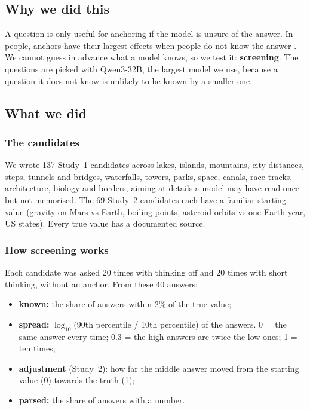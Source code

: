 \documentclass[11pt,a4paper]{article}
\begin{document}
\subsection{Why we did this}
A question is only useful for anchoring if the model is unsure of the answer. In people, anchors have their largest effects when people do not know the answer \citep{jacowitz1995measures}. We cannot guess in advance what a model knows, so we test it: \textbf{screening}. The questions are picked with Qwen3-32B, the largest model we use, because a question it does not know is unlikely to be known by a smaller one.

\subsection{What we did}

\subsubsection{The candidates}
We wrote 137 Study~1 candidates across lakes, islands, mountains, city distances, steps, tunnels and bridges, waterfalls, towers, parks, space, canals, race tracks, architecture, biology and borders, aiming at details a model may have read once but not memorised. The 69 Study~2 candidates each have a familiar starting value (gravity on Mars vs Earth, boiling points, asteroid orbits vs one Earth year, US states). Every true value has a documented source.

\subsubsection{How screening works}
Each candidate was asked 20 times with thinking off and 20 times with short thinking, without an anchor. From these 40 answers:
\begin{itemize}[leftmargin=*]
  \item \textbf{known:} the share of answers within 2\% of the true value;
  \item \textbf{spread:} $\log_{10}$(90th percentile / 10th percentile) of the answers. 0 = the same answer every time; 0.3 = the high answers are twice the low ones; 1 = ten times;
  \item \textbf{adjustment} (Study~2): how far the middle answer moved from the starting value (0) towards the truth (1);
  \item \textbf{parsed:} the share of answers with a number.
\end{itemize}
\end{document}
